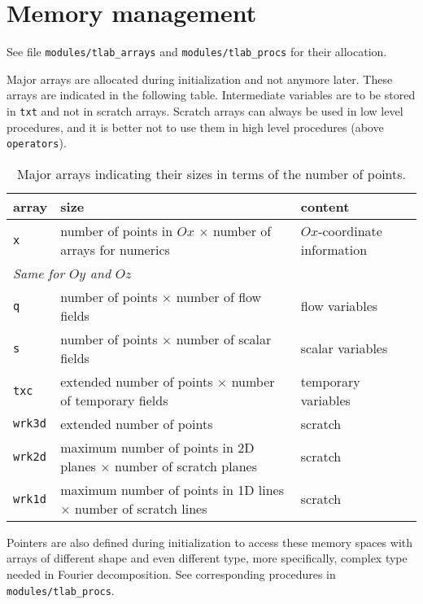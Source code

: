 \chapter{Memory management}

See file \texttt{modules/tlab\_arrays} and \texttt{modules/tlab\_procs} for their allocation.

Major arrays are allocated during initialization and not anymore later. These arrays are indicated in the following table. Intermediate variables are to be stored in \texttt{txt} and not in scratch arrays. Scratch arrays can always be used in low level procedures, and it is better not to use them in high level procedures (above \texttt{operators}).

\begin{table}[!h]
    \footnotesize
    \renewcommand{\arraystretch}{1.2}
    \centering
    \begin{tabular}{lll}
        \hline
        array & size & content \\
        \hline
        \texttt{x}      & number of points in $Ox$ $\times$ number of arrays for numerics           & $Ox$-coordinate information        \\
        \multicolumn{3}{l}{\it Same for $Oy$ and $Oz$} \\  
        \texttt{q}      & number of points $\times$ number of flow fields                           & flow variables        \\
        \texttt{s}      & number of points $\times$ number of scalar fields                         & scalar variables      \\
        \texttt{txc}    & extended number of points $\times$ number of temporary fields             & temporary variables   \\
        \texttt{wrk3d}  & extended number of points                                                 & scratch               \\
        \texttt{wrk2d}  & maximum number of points in 2D planes $\times$ number of scratch planes   & scratch               \\
        \texttt{wrk1d}  & maximum number of points in 1D lines $\times$ number of scratch lines     & scratch               \\
        \hline
    \end{tabular}
    \caption{Major arrays indicating their sizes in terms of the number of points.}
\end{table}

Pointers are also defined during initialization to access these memory spaces with arrays of different shape and even different type, more specifically, complex type needed in Fourier decomposition. See corresponding procedures in \texttt{modules/tlab\_procs}.